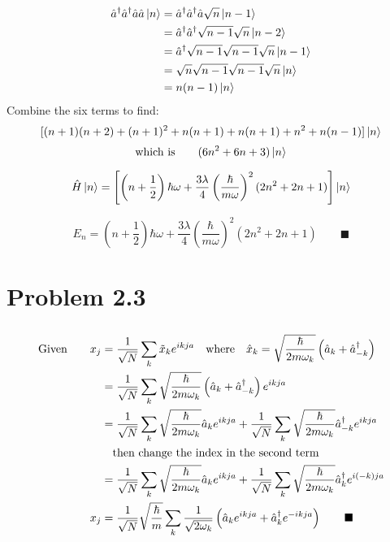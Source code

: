 \documentclass{amsart}
\begin{document}
\begin{align*}
    \hat{a}^\dagger\hat{a}^\dagger\hat{a}\hat{a}\ket{n}&=\hat{a}^\dagger\hat{a}^\dagger\hat{a}\sqrt{n}\ket{n-1}\\
    &=\hat{a}^\dagger\hat{a}^\dagger\sqrt{n-1}\sqrt{n}\ket{n-2}\\
    &=\hat{a}^\dagger\sqrt{n-1}\sqrt{n-1}\sqrt{n}\ket{n-1}\\
    &=\sqrt{n}\sqrt{n-1}\sqrt{n-1}\sqrt{n}\ket{n}\\
    &=n(n-1)\ket{n}
\end{align*}
Combine the six terms to find:
\[[(n+1)(n+2)+(n+1)^2+n(n+1)+n(n+1)+n^2+n(n-1)]\ket{n}\]
\[\text{which is}\qquad(6n^2+6n+3)\ket{n}\]

\[\hat{H}\ket{n}=\left[\left(n+\frac{1}{2}\right)\hbar\omega+\frac{3\lambda}{4}\left(\frac{\hbar}{m\omega}\right)^2(2n^2+2n+1)\right]\ket{n}\]

\[E_n=\left(n+\frac{1}{2}\right)\hbar\omega+\frac{3\lambda}{4}\left(\frac{\hbar}{m\omega}\right)^2(2n^2+2n+1)\qquad\blacksquare\]

\section*{Problem 2.3}
\[\]
\begin{align*}
    \text{Given}\qquad x_j&=\frac{1}{\sqrt{N}}\sum_k \tilde{x}_k e^{ikja}\qq{where} \hat{x}_k=\sqrt{\frac{\hbar}{2m\omega_k}}\left(\hat{a}_k+\hat{a}^\dagger_{-k}\right)\\
    &=\frac{1}{\sqrt{N}}\sum_k \sqrt{\frac{\hbar}{2m\omega_k}}\left(\hat{a}_k+\hat{a}^\dagger_{-k}\right) e^{ikja}\\
    &=\frac{1}{\sqrt{N}}\sum_k \sqrt{\frac{\hbar}{2m\omega_k}}\hat{a}_k e^{ikja}+\frac{1}{\sqrt{N}}\sum_k \sqrt{\frac{\hbar}{2m\omega_k}}\hat{a}^\dagger_{-k} e^{ikja}\\
    &\qq{then change the index in the second term}\\
    &=\frac{1}{\sqrt{N}}\sum_k \sqrt{\frac{\hbar}{2m\omega_k}}\hat{a}_k e^{ikja}+\frac{1}{\sqrt{N}}\sum_k \sqrt{\frac{\hbar}{2m\omega_{k}}}\hat{a}^\dagger_{k} e^{i(-k)ja}\\
    x_j&=\frac{1}{\sqrt{N}}\sqrt{\frac{\hbar}{m}}\sum_k \frac{1}{\sqrt{2\omega_k}}\left(\hat{a}_k e^{ikja}+\hat{a}^\dagger_{k} e^{-ikja}\right)\qquad\blacksquare
\end{align*}
\end{document}
